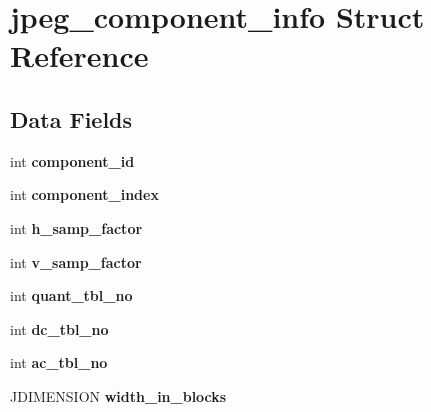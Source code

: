 \hypertarget{structjpeg__component__info}{}\section{jpeg\+\_\+component\+\_\+info Struct Reference}
\label{structjpeg__component__info}
\subsection*{Data Fields}
\begin{DoxyCompactItemize}
\item 
\mbox{\label{structjpeg__component__info_a837a81e689cb3cea08378a005c64756c}} 
int {\bfseries component\+\_\+id}
\item 
\mbox{\label{structjpeg__component__info_a930e7905604f959c1e0139bf44044a90}} 
int {\bfseries component\+\_\+index}
\item 
\mbox{\label{structjpeg__component__info_af46bdb3fcc7bb5b08ccc86ad8c165530}} 
int {\bfseries h\+\_\+samp\+\_\+factor}
\item 
\mbox{\label{structjpeg__component__info_abd8d516dafc966ad01a625a3de0a32c5}} 
int {\bfseries v\+\_\+samp\+\_\+factor}
\item 
\mbox{\label{structjpeg__component__info_aaa927289c2c3523daadb891182b847a9}} 
int {\bfseries quant\+\_\+tbl\+\_\+no}
\item 
\mbox{\label{structjpeg__component__info_a680e2bc137ca8527cc6740b5d5179eed}} 
int {\bfseries dc\+\_\+tbl\+\_\+no}
\item 
\mbox{\label{structjpeg__component__info_af6066d297004cb585d046de1e8deab09}} 
int {\bfseries ac\+\_\+tbl\+\_\+no}
\item 
\mbox{\label{structjpeg__component__info_af2ead60f7dff21b4d52dcd823b89c996}} 
J\+D\+I\+M\+E\+N\+S\+I\+ON {\bfseries width\+\_\+in\+\_\+blocks}
\item 
\mbox{\label{structjpeg__component__info_ab7310196608af778bd47929bdb97142f}} 

\end{DoxyCompactItemize}
